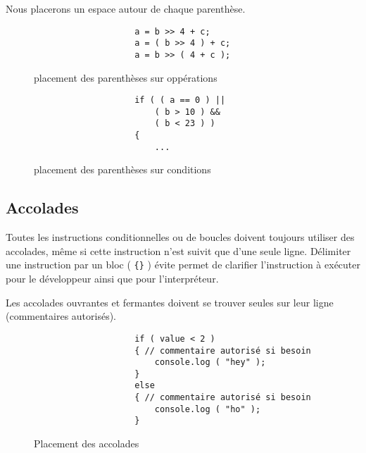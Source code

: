 			Nous placerons un espace autour de chaque parenthèse.

			\begin{figure}[H]
				\begin{changemargin}{-2.5cm}{-2.5cm}
				\begin{tcolorbox}
				\begin{verbatim}
					a = b >> 4 + c;
					a = ( b >> 4 ) + c;
					a = b >> ( 4 + c );
				\end{verbatim}
				\end{tcolorbox}
				\end{changemargin}
				\caption{placement des parenthèses sur oppérations}

				\begin{changemargin}{-2.5cm}{-2.5cm}
				\begin{tcolorbox}
				\begin{verbatim}
					if ( ( a == 0 ) ||
					    ( b > 10 ) &&
					    ( b < 23 ) )
					{
					    ...
				\end{verbatim}
				\end{tcolorbox}
				\end{changemargin}
				\caption{placement des parenthèses sur conditions}
			\end{figure}

		\subsection{Accolades}
			Toutes les instructions conditionnelles ou de boucles doivent toujours utiliser des accolades, même si cette instruction n'est suivit que d'une seule ligne. Délimiter une instruction par un bloc ( \verb+{}+ ) évite permet de clarifier l'instruction à exécuter pour le développeur ainsi que pour l'interpréteur.

			Les accolades ouvrantes et fermantes doivent se trouver seules sur leur ligne (commentaires autorisés).

			\begin{figure}[H]
				\begin{changemargin}{-2.5cm}{-2.5cm}
				\begin{tcolorbox}
				\begin{verbatim}
					if ( value < 2 )
					{ // commentaire autorisé si besoin
					    console.log ( "hey" );
					}
					else
					{ // commentaire autorisé si besoin
					    console.log ( "ho" );
					}
				\end{verbatim}
				\end{tcolorbox}
				\end{changemargin}
				\caption{Placement des accolades}
			\end{figure}

